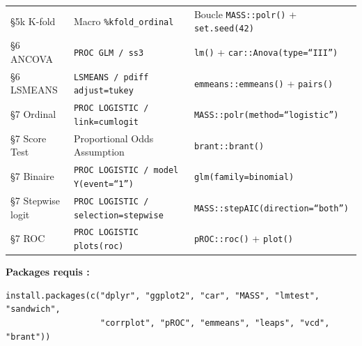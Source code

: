 \documentclass[11pt,a4paper]{memoirerecherche}
\begin{document}
\begin{tabular}{@{} l l l @{}}
\S{}5k K-fold & Macro \texttt{\%kfold\_ordinal} & Boucle \texttt{MASS::polr()} + \texttt{set.seed(42)} \\
\S{}6 ANCOVA & \texttt{PROC GLM / ss3} & \texttt{lm()} + \texttt{car::Anova(type=``III'')} \\
\S{}6 LSMEANS & \texttt{LSMEANS / pdiff adjust=tukey} & \texttt{emmeans::emmeans()} + \texttt{pairs()} \\
\S{}7 Ordinal & \texttt{PROC LOGISTIC / link=cumlogit} & \texttt{MASS::polr(method=``logistic'')} \\
\S{}7 Score Test & Proportional Odds Assumption & \texttt{brant::brant()} \\
\S{}7 Binaire & \texttt{PROC LOGISTIC / model Y(event=``1'')} & \texttt{glm(family=binomial)} \\
\S{}7 Stepwise logit & \texttt{PROC LOGISTIC / selection=stepwise} & \texttt{MASS::stepAIC(direction=``both'')} \\
\S{}7 ROC & \texttt{PROC LOGISTIC plots(roc)} & \texttt{pROC::roc()} + \texttt{plot()} \\
\bottomrule
\end{tabular}

\medskip
\noindent\textbf{Packages requis :}
\begin{footnotesize}
\begin{verbatim}
install.packages(c("dplyr", "ggplot2", "car", "MASS", "lmtest", "sandwich",
                   "corrplot", "pROC", "emmeans", "leaps", "vcd", "brant"))
\end{verbatim}
\end{footnotesize}

\bigskip
\end{document}
